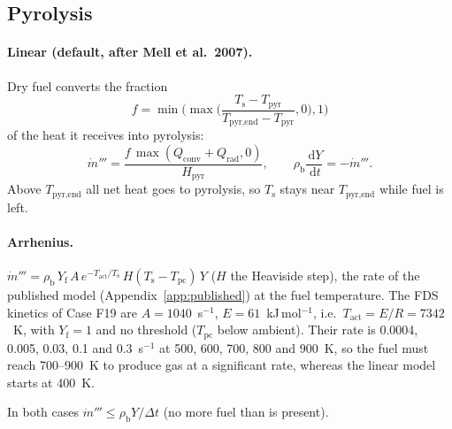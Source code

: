 \documentclass[11pt,a4paper]{article}
\newcommand{\dd}{\,\mathrm{d}}
\begin{document}
\subsection{Pyrolysis}
\paragraph{Linear (default, after Mell et al.\ 2007).} Dry fuel converts the fraction
\begin{equation}
  f = \min\!\Big(\max\!\Big(\frac{T_\text{s}-T_\text{pyr}}{T_\text{pyr,end}-T_\text{pyr}},0\Big),1\Big)
\end{equation}
of the heat it receives into pyrolysis:
\begin{equation}
  \dot m''' = \frac{f\,\max(Q_\text{conv}+Q_\text{rad},0)}{H_\text{pyr}},\qquad \rho_\text{b}\frac{\dd Y}{\dd t}=-\dot m'''.
\end{equation}
Above $T_\text{pyr,end}$ all net heat goes to pyrolysis, so $T_\text{s}$ stays near $T_\text{pyr,end}$ while fuel is left.

\paragraph{Arrhenius.} $\dot m''' = \rho_\text{b}\,Y_\text{f}\,A\,e^{-T_\text{act}/T_\text{s}}\,H(T_\text{s}-T_\text{pc})\,Y$ ($H$ the
Heaviside step), the rate of the published model (Appendix~\ref{app:published}) at the fuel temperature.
The FDS kinetics of Case F19 are $A=1040$~s$^{-1}$, $E=61$~kJ\,mol$^{-1}$, i.e.\ $T_\text{act}=E/R=7342$~K,
with $Y_\text{f}=1$ and no threshold ($T_\text{pc}$ below ambient). Their rate is 0.0004, 0.005, 0.03, 0.1 and
0.3~s$^{-1}$ at 500, 600, 700, 800 and 900~K, so the fuel must reach 700--900~K to produce gas at a
significant rate, whereas the linear model starts at 400~K.

\noindent In both cases $\dot m'''\le\rho_\text{b}Y/\Delta t$ (no more fuel than is present).
\end{document}
